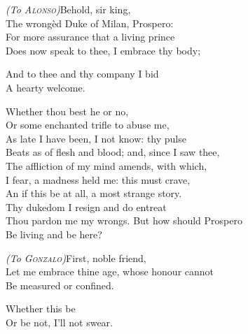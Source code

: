 \begin{verse_speech}[Prospero] 
\textit{(To \textsc{Alonso})}Behold, sir king,\\
The wrongèd Duke of Milan, Prospero:\\
For more assurance that a living prince\\
Does now speak to thee, I embrace thy body;\\


And to thee and thy company I bid\\
A hearty welcome.
\end{verse_speech}

\begin{verse_speech}[Alonso] 
Whether thou best he or no,\\
Or some enchanted trifle to abuse me,\\
As late I have been, I not know: thy pulse\\
Beats as of flesh and blood; and, since I saw thee,\\
The affliction of my mind amends, with which,\\
I fear, a madness held me: this must crave,\\
An if this be at all, a most strange story.\\
Thy dukedom I resign and do entreat\\
Thou pardon me my wrongs. But how should Prospero\\
Be living and be here?
\end{verse_speech}

\begin{verse_speech}[Prospero] 
\textit{(To \textsc{Gonzalo})}First, noble friend,\\
Let me embrace thine age, whose honour cannot\\
Be measured or confined.
\end{verse_speech}

\begin{verse_speech}[Gonzalo] 
Whether this be\\
Or be not, I'll not swear.
\end{verse_speech}



